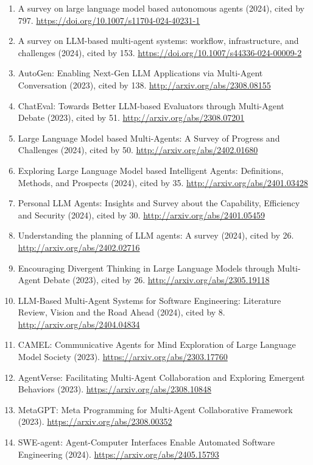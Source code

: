 \documentclass[
]{article}
\providecommand{\tightlist}{%
  \setlength{\itemsep}{0pt}\setlength{\parskip}{0pt}}
\begin{document}
\begin{enumerate}
\def\labelenumi{\arabic{enumi}.}
\tightlist
\item
  A survey on large language model based autonomous agents (2024), cited
  by 797. \url{https://doi.org/10.1007/s11704-024-40231-1}
\item
  A survey on LLM-based multi-agent systems: workflow, infrastructure,
  and challenges (2024), cited by 153.
  \url{https://doi.org/10.1007/s44336-024-00009-2}
\item
  AutoGen: Enabling Next-Gen LLM Applications via Multi-Agent
  Conversation (2023), cited by 138.
  \url{http://arxiv.org/abs/2308.08155}
\item
  ChatEval: Towards Better LLM-based Evaluators through Multi-Agent
  Debate (2023), cited by 51. \url{http://arxiv.org/abs/2308.07201}
\item
  Large Language Model based Multi-Agents: A Survey of Progress and
  Challenges (2024), cited by 50. \url{http://arxiv.org/abs/2402.01680}
\item
  Exploring Large Language Model based Intelligent Agents: Definitions,
  Methods, and Prospects (2024), cited by 35.
  \url{http://arxiv.org/abs/2401.03428}
\item
  Personal LLM Agents: Insights and Survey about the Capability,
  Efficiency and Security (2024), cited by 30.
  \url{http://arxiv.org/abs/2401.05459}
\item
  Understanding the planning of LLM agents: A survey (2024), cited by
  26. \url{http://arxiv.org/abs/2402.02716}
\item
  Encouraging Divergent Thinking in Large Language Models through
  Multi-Agent Debate (2023), cited by 26.
  \url{http://arxiv.org/abs/2305.19118}
\item
  LLM-Based Multi-Agent Systems for Software Engineering: Literature
  Review, Vision and the Road Ahead (2024), cited by 8.
  \url{http://arxiv.org/abs/2404.04834}
\item
  CAMEL: Communicative Agents for Mind Exploration of Large Language
  Model Society (2023). \url{https://arxiv.org/abs/2303.17760}
\item
  AgentVerse: Facilitating Multi-Agent Collaboration and Exploring
  Emergent Behaviors (2023). \url{https://arxiv.org/abs/2308.10848}
\item
  MetaGPT: Meta Programming for Multi-Agent Collaborative Framework
  (2023). \url{https://arxiv.org/abs/2308.00352}
\item
  SWE-agent: Agent-Computer Interfaces Enable Automated Software
  Engineering (2024). \url{https://arxiv.org/abs/2405.15793}
\end{enumerate}
\end{document}
